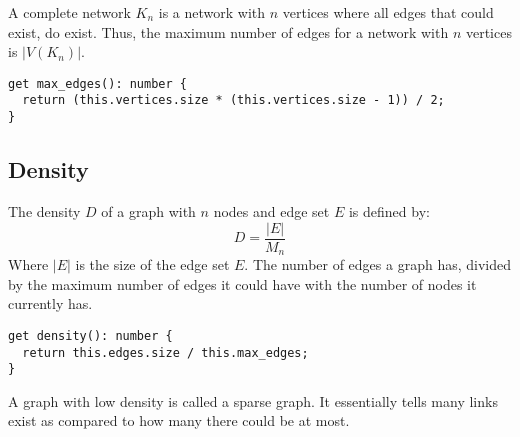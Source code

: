 A complete network $K_n$ is a network with $n$ vertices
where all edges that could exist, do exist.
Thus, the maximum number of edges for a network with $n$ vertices
is $|V(K_n)|$.

\begin{verbatim}
get max_edges(): number {
  return (this.vertices.size * (this.vertices.size - 1)) / 2;
}
\end{verbatim}

\subsection{Density}

The density $D$ of a graph with $n$ nodes and edge set $E$ is defined by:
$$D=\frac{|E|}{M_n}$$
Where $|E|$ is the size of the edge set $E$.
The number of edges a graph has,
divided by the maximum number of edges it could have with the number of nodes it currently has.

\begin{verbatim}
get density(): number {
  return this.edges.size / this.max_edges;
}
\end{verbatim}

A graph with low density is called a sparse graph.
It essentially tells many links exist as compared to how many there could be at most.